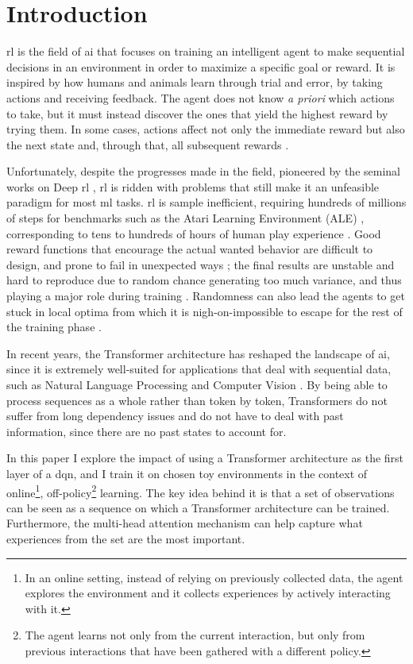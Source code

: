 \section{Introduction}
\acrfull{rl} is the field of \acrlong{ai} that focuses on training an intelligent agent to make sequential decisions in an environment in order to maximize a specific goal or reward. It is inspired by how humans and animals learn through trial and error, by taking actions and receiving feedback. The agent does not know \textit{a priori} which actions to take, but it must instead discover the ones that yield the highest reward by trying them. In some cases, actions affect not only the immediate reward but also the next state and, through that, all subsequent rewards \cite{rlbook,rlbook2}.

Unfortunately, despite the progresses made in the field, pioneered by the seminal works on Deep \acrlong{rl} \cite{dqn1,dqn2}, \acrshort{rl} is ridden with problems that still make it an unfeasible paradigm for most \acrfull{ml} tasks. \acrshort{rl} is sample inefficient, requiring hundreds of millions of steps for benchmarks such as the Atari Learning Environment (ALE) \cite{atari}, corresponding to tens to hundreds of hours of human play experience \cite{rldoesntwork,rainbow}. Good reward functions that encourage the actual wanted behavior are difficult to design, and prone to fail in unexpected ways \cite{rldoesntwork,concrete_problems_in_ai_safety}; the final results are unstable and hard to reproduce due to random chance generating too much variance, and thus playing a major role during training \cite{drl_that_matters,rldoesntwork}. Randomness can also lead the agents to get stuck in local optima from which it is nigh-on-impossible to escape for the rest of the training phase \cite{rldoesntwork}.

In recent years, the Transformer architecture has reshaped the landscape of \acrshort{ai}, since it is extremely well-suited for applications that deal with sequential data, such as Natural Language Processing \cite{gpt2,gpt3} and Computer Vision \cite{swin_transformer}. By being able to process sequences as a whole rather than token by token, Transformers do not suffer from long dependency issues and do not have to deal with past information, since there are no past states to account for.

In this paper I explore the impact of using a Transformer architecture as the first layer of a \acrfull{dqn}, and I train it on chosen toy environments in the context of online\footnote{In an online setting, instead of relying on previously collected data, the agent explores the environment and it collects experiences by actively interacting with it.}, off-policy\footnote{The agent learns not only from the current interaction, but only from previous interactions that have been gathered with a different policy.} learning. The key idea behind it is that a set of observations can be seen as a sequence on which a Transformer architecture can be trained. Furthermore, the multi-head attention mechanism can help capture what experiences from the set are the most important.

